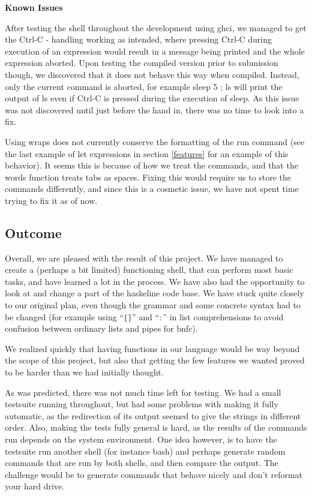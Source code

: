 \documentclass[11pt,a4paper]{article}
\begin{document}
\textbf{Known Issues}

After testing the shell throughout the development using ghci, we managed to
get the Ctrl-C - handling working as intended, where pressing Ctrl-C during
execution of an expression would result in a message being printed and the
whole expression aborted. Upon testing the compiled version prior to submission
though, we discovered that it does not behave this way when compiled. Instead,
only the current command is aborted, for example sleep 5 ; ls will print the
output of ls even if Ctrl-C is pressed during the execution of sleep. As this
issue was not discovered until just before the hand in, there was no time to
look into a fix.

Using wraps does not currently conserve the formatting of the run command (see
the last example of let expressions in section \ref{features} for an example of
this behavior). It seems this is because of how we treat the commands, and that
the words function treats tabs as spaces. Fixing this would require us to store
the commands differently, and since this is a cosmetic issue, we have not spent
time trying to fix it as of now.

\subsection{Outcome}

Overall, we are pleased with the result of this project. We have managed to
create a (perhaps a bit limited) functioning shell, that can perform most basic
tasks, and have learned a lot in the process. We have also had the opportunity
to look at and change a part of the haskeline code base. We have stuck quite
closely to our original plan, even though the grammar and some concrete syntax
had to be changed (for example using ``$\{\}$'' and ``$:$'' in list comprehensions
to avoid confusion between ordinary lists and pipes for bnfc).

We realized quickly that having functions in our language would be way beyond
the scope of this project, but also that getting the few features we wanted
proved to be harder than we had initially thought.

As was predicted, there was not much time left for testing. We had a small
testsuite running throughout, but had some problems with making it fully
automatic, as the redirection of its output seemed to give the strings in
different order. Also, making the tests fully general is hard, as the results
of the commands run depends on the system environment. One idea however, is
to have the testsuite run another shell (for instance bash) and perhaps
generate random commands that are run by both shells, and then compare the
output. The challenge would be to generate commands that behave nicely and don't
reformat your hard drive.
\end{document}
